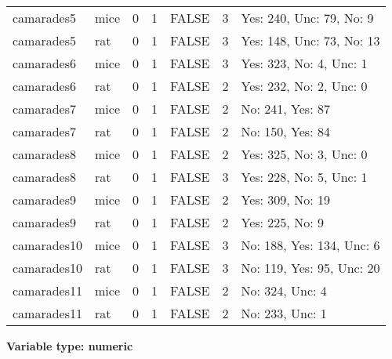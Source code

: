 \documentclass[
]{article}
\begin{document}
\begin{longtable}[]{@{}llrrlrl@{}}
camarades5 & mice & 0 & 1 & FALSE & 3 & Yes: 240, Unc: 79, No: 9 \\
camarades5 & rat & 0 & 1 & FALSE & 3 & Yes: 148, Unc: 73, No: 13 \\
camarades6 & mice & 0 & 1 & FALSE & 3 & Yes: 323, No: 4, Unc: 1 \\
camarades6 & rat & 0 & 1 & FALSE & 2 & Yes: 232, No: 2, Unc: 0 \\
camarades7 & mice & 0 & 1 & FALSE & 2 & No: 241, Yes: 87 \\
camarades7 & rat & 0 & 1 & FALSE & 2 & No: 150, Yes: 84 \\
camarades8 & mice & 0 & 1 & FALSE & 2 & Yes: 325, No: 3, Unc: 0 \\
camarades8 & rat & 0 & 1 & FALSE & 3 & Yes: 228, No: 5, Unc: 1 \\
camarades9 & mice & 0 & 1 & FALSE & 2 & Yes: 309, No: 19 \\
camarades9 & rat & 0 & 1 & FALSE & 2 & Yes: 225, No: 9 \\
camarades10 & mice & 0 & 1 & FALSE & 3 & No: 188, Yes: 134, Unc: 6 \\
camarades10 & rat & 0 & 1 & FALSE & 3 & No: 119, Yes: 95, Unc: 20 \\
camarades11 & mice & 0 & 1 & FALSE & 2 & No: 324, Unc: 4 \\
camarades11 & rat & 0 & 1 & FALSE & 2 & No: 233, Unc: 1 \\
\bottomrule
\end{longtable}

\textbf{Variable type: numeric}
\end{document}
